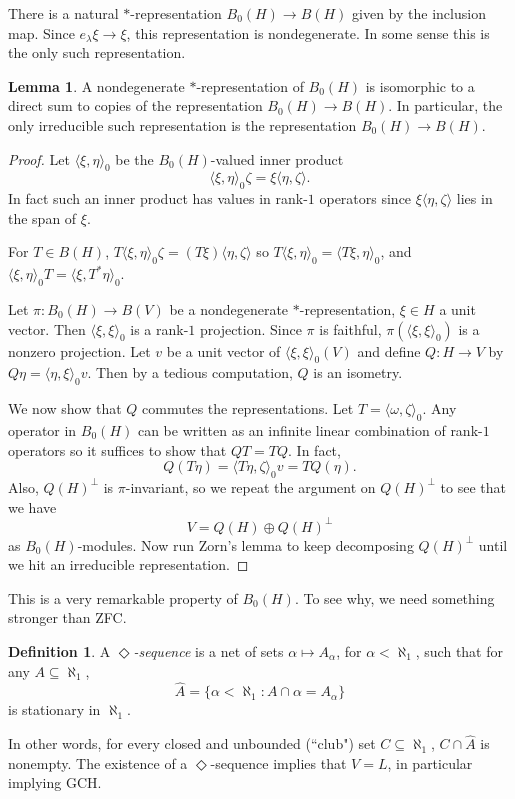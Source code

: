 \documentclass[12pt]{report}
\newcommand{\dfn}[1]{\emph{#1}\index{#1}}
\theoremstyle{definition}
\newtheorem{lemma}[theorem]{Lemma}
\newtheorem{definition}[theorem]{Definition}
\begin{document}
There is a natural $*$-representation $B_0(H) \to B(H)$ given by the inclusion map. Since $e_\lambda\xi \to \xi$, this representation is nondegenerate. In some sense this is the only such representation.
\begin{lemma}
    A nondegenerate $*$-representation of $B_0(H)$ is isomorphic to a direct sum to copies of the representation $B_0(H) \to B(H)$. In particular, the only irreducible such representation is the representation $B_0(H) \to B(H)$.
\end{lemma}
\begin{proof}
    Let $\langle \xi, \eta\rangle_0$ be the $B_0(H)$-valued inner product
    $$\langle \xi, \eta\rangle_0 \zeta = \xi \langle \eta, \zeta\rangle.$$
    In fact such an inner product has values in rank-$1$ operators since $\xi \langle \eta, \zeta\rangle$ lies in the span of $\xi$.

    For $T \in B(H)$, $T\langle \xi, \eta\rangle_0\zeta = (T\xi)\langle \eta, \zeta\rangle$ so $T\langle \xi, \eta\rangle_0 = \langle T\xi, \eta\rangle_0$, and $\langle \xi, \eta\rangle_0T = \langle \xi, T^*\eta\rangle_0$.

    Let $\pi: B_0(H) \to B(V)$ be a nondegenerate $*$-representation, $\xi \in H$ a unit vector. Then $\langle \xi, \xi\rangle_0$ is a rank-$1$ projection. Since $\pi$ is faithful, $\pi(\langle \xi, \xi\rangle_0)$ is a nonzero projection. Let $v$ be a unit vector of $\langle \xi, \xi\rangle_0(V)$ and define $Q: H \to V$ by $Q\eta = \langle \eta, \xi\rangle_0 v$. Then by a tedious computation, $Q$ is an isometry.

    We now show that $Q$ commutes the representations. Let $T = \langle \omega, \zeta\rangle_0$. Any operator in $B_0(H)$ can be written as an infinite linear combination of rank-$1$ operators so it suffices to show that $QT = TQ$. In fact,
    $$Q(T\eta) = \langle T\eta, \zeta\rangle_0 v = TQ(\eta).$$
    Also, $Q(H)^\perp$ is $\pi$-invariant, so we repeat the argument on $Q(H)^\perp$ to see that we have
    $$V = Q(H) \oplus Q(H)^\perp$$
    as $B_0(H)$-modules. Now run Zorn's lemma to keep decomposing $Q(H)^\perp$ until we hit an irreducible representation.
\end{proof}

This is a very remarkable property of $B_0(H)$. To see why, we need something stronger than ZFC.
\begin{definition}
    A \dfn{$\Diamond$-sequence} is a net of sets $\alpha \mapsto A_\alpha$, for $\alpha < \aleph_1$, such that for any $A \subseteq \aleph_1$,
    $$\hat A = \{\alpha < \aleph_1: A \cap \alpha = A_\alpha\}$$
    is stationary in $\aleph_1$.
\end{definition}
In other words, for every closed and unbounded (``club") set $C \subseteq \aleph_1$, $C \cap \hat A$ is nonempty. The existence of a $\Diamond$-sequence implies that $V = L$, in particular implying GCH.
\end{document}
